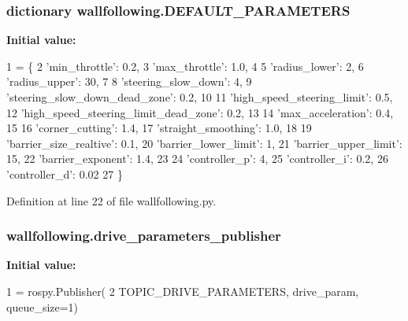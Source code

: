 \subsubsection[{\texorpdfstring{D\+E\+F\+A\+U\+L\+T\+\_\+\+P\+A\+R\+A\+M\+E\+T\+E\+RS}{DEFAULT_PARAMETERS}}]{\setlength{\rightskip}{0pt plus 5cm}dictionary wallfollowing.\+D\+E\+F\+A\+U\+L\+T\+\_\+\+P\+A\+R\+A\+M\+E\+T\+E\+RS}\hypertarget{namespacewallfollowing_ac161be1e11f04000d35ca725afa3ccdf}{}\label{namespacewallfollowing_ac161be1e11f04000d35ca725afa3ccdf}
{\bfseries Initial value\+:}
\begin{DoxyCode}
1 = \{
2     \textcolor{stringliteral}{'min\_throttle'}: 0.2,
3     \textcolor{stringliteral}{'max\_throttle'}: 1.0,
4 
5     \textcolor{stringliteral}{'radius\_lower'}: 2,
6     \textcolor{stringliteral}{'radius\_upper'}: 30,
7 
8     \textcolor{stringliteral}{'steering\_slow\_down'}: 4,
9     \textcolor{stringliteral}{'steering\_slow\_down\_dead\_zone'}: 0.2,
10 
11     \textcolor{stringliteral}{'high\_speed\_steering\_limit'}: 0.5,
12     \textcolor{stringliteral}{'high\_speed\_steering\_limit\_dead\_zone'}: 0.2,
13 
14     \textcolor{stringliteral}{'max\_acceleration'}: 0.4,
15 
16     \textcolor{stringliteral}{'corner\_cutting'}: 1.4,
17     \textcolor{stringliteral}{'straight\_smoothing'}: 1.0,
18 
19     \textcolor{stringliteral}{'barrier\_size\_realtive'}: 0.1,
20     \textcolor{stringliteral}{'barrier\_lower\_limit'}: 1,
21     \textcolor{stringliteral}{'barrier\_upper\_limit'}: 15,
22     \textcolor{stringliteral}{'barrier\_exponent'}: 1.4,
23 
24     \textcolor{stringliteral}{'controller\_p'}: 4,
25     \textcolor{stringliteral}{'controller\_i'}: 0.2,
26     \textcolor{stringliteral}{'controller\_d'}: 0.02
27 \}
\end{DoxyCode}


Definition at line 22 of file wallfollowing.\+py.

\subsubsection[{\texorpdfstring{drive\+\_\+parameters\+\_\+publisher}{drive_parameters_publisher}}]{\setlength{\rightskip}{0pt plus 5cm}wallfollowing.\+drive\+\_\+parameters\+\_\+publisher}\hypertarget{namespacewallfollowing_aa69138defbbc5f21e99db50a6b3c903f}{}\label{namespacewallfollowing_aa69138defbbc5f21e99db50a6b3c903f}
{\bfseries Initial value\+:}
\begin{DoxyCode}
1 = rospy.Publisher(
2     TOPIC\_DRIVE\_PARAMETERS, drive\_param, queue\_size=1)
\end{DoxyCode}


